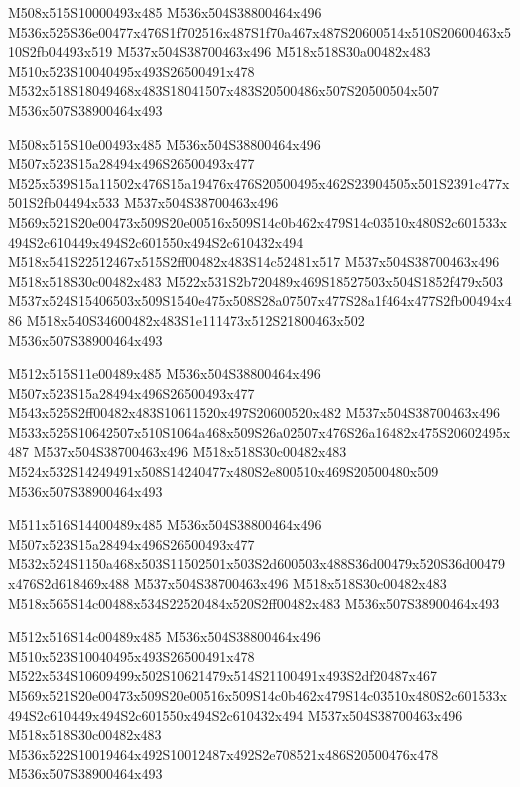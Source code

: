 \documentclass{article}
\begin{document}
\begin{multicols}{5}
\begin{center}

M508x515S10000493x485 %
M536x504S38800464x496 %
M536x525S36e00477x476S1f702516x487S1f70a467x487S20600514x510S20600463x510S2fb04493x519 %
M537x504S38700463x496 %
M518x518S30a00482x483 %
M510x523S10040495x493S26500491x478 %
M532x518S18049468x483S18041507x483S20500486x507S20500504x507 %
M536x507S38900464x493 %
\vfil
\columnbreak

M508x515S10e00493x485 %
M536x504S38800464x496 %
M507x523S15a28494x496S26500493x477 %
M525x539S15a11502x476S15a19476x476S20500495x462S23904505x501S2391c477x501S2fb04494x533 %
M537x504S38700463x496 %
M569x521S20e00473x509S20e00516x509S14c0b462x479S14c03510x480S2c601533x494S2c610449x494S2c601550x494S2c610432x494 %
M518x541S22512467x515S2ff00482x483S14c52481x517 %
M537x504S38700463x496 %
M518x518S30c00482x483 %
M522x531S2b720489x469S18527503x504S1852f479x503 %
M537x524S15406503x509S1540e475x508S28a07507x477S28a1f464x477S2fb00494x486 %
M518x540S34600482x483S1e111473x512S21800463x502 %
M536x507S38900464x493 %
\vfil
\columnbreak

M512x515S11e00489x485 %
M536x504S38800464x496 %
M507x523S15a28494x496S26500493x477 %
M543x525S2ff00482x483S10611520x497S20600520x482 %
M537x504S38700463x496 %
M533x525S10642507x510S1064a468x509S26a02507x476S26a16482x475S20602495x487 %
M537x504S38700463x496 %
M518x518S30c00482x483 %
M524x532S14249491x508S14240477x480S2e800510x469S20500480x509 %
M536x507S38900464x493 %
\vfil
\columnbreak

M511x516S14400489x485 %
M536x504S38800464x496 %
M507x523S15a28494x496S26500493x477 %
M532x524S1150a468x503S11502501x503S2d600503x488S36d00479x520S36d00479x476S2d618469x488 %
M537x504S38700463x496 %
M518x518S30c00482x483 %
M518x565S14c00488x534S22520484x520S2ff00482x483 %
M536x507S38900464x493 %
\vfil
\columnbreak

M512x516S14c00489x485 %
M536x504S38800464x496 %
M510x523S10040495x493S26500491x478 %
M522x534S10609499x502S10621479x514S21100491x493S2df20487x467 %
M569x521S20e00473x509S20e00516x509S14c0b462x479S14c03510x480S2c601533x494S2c610449x494S2c601550x494S2c610432x494 %
M537x504S38700463x496 %
M518x518S30c00482x483 %
M536x522S10019464x492S10012487x492S2e708521x486S20500476x478 %
M536x507S38900464x493 %
\vfil

\end{center}
\end{multicols}
\end{document}
